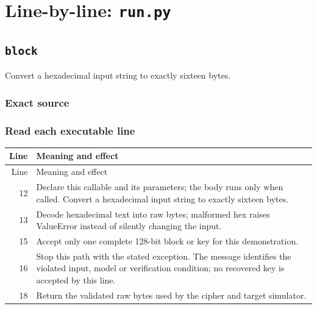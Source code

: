 \chapter{Line-by-line: \texttt{run.py}}
\section{\texttt{block}}
Convert a hexadecimal input string to exactly sixteen bytes.
\begin{center}\end{center}
\subsection*{Exact source}
\subsection*{Read each executable line}
\begingroup\small\begin{longtable}{r >{\raggedright\arraybackslash}p{138mm}}\toprule Line&Meaning and effect\\\midrule\endfirsthead\toprule Line&Meaning and effect\\\midrule\endhead
12&Declare this callable and its parameters; the body runs only when called. Convert a hexadecimal input string to exactly sixteen bytes.\\
13&Decode hexadecimal text into raw bytes; malformed hex raises ValueError instead of silently changing the input.\\
15&Accept only one complete 128-bit block or key for this demonstration.\\
16&Stop this path with the stated exception. The message identifies the violated input, model or verification condition; no recovered key is accepted by this line.\\
18&Return the validated raw bytes used by the cipher and target simulator.\\
\bottomrule\end{longtable}\endgroup
